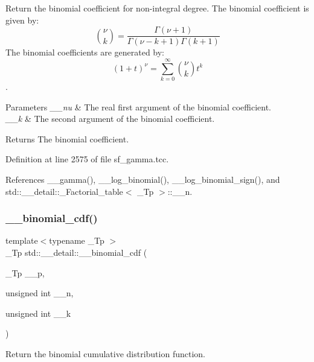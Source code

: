 Return the binomial coefficient for non-\/integral degree. The binomial coefficient is given by\+: \[ \binom{\nu}{k} = \frac{\Gamma(\nu+1)}{\Gamma(\nu-k+1) \Gamma(k+1)} \] The binomial coefficients are generated by\+: \[ \left(1 + t\right)^\nu = \sum_{k=0}^\infty \binom{\nu}{k} t^k \]. 


\begin{DoxyParams}{Parameters}
{\em \+\_\+\+\_\+nu} & The real first argument of the binomial coefficient. \\
\hline
{\em \+\_\+\+\_\+k} & The second argument of the binomial coefficient. \\
\hline
\end{DoxyParams}
\begin{DoxyReturn}{Returns}
The binomial coefficient. 
\end{DoxyReturn}


Definition at line 2575 of file sf\+\_\+gamma.\+tcc.



References \+\_\+\+\_\+gamma(), \+\_\+\+\_\+log\+\_\+binomial(), \+\_\+\+\_\+log\+\_\+binomial\+\_\+sign(), and std\+::\+\_\+\+\_\+detail\+::\+\_\+\+Factorial\+\_\+table$<$ \+\_\+\+Tp $>$\+::\+\_\+\+\_\+n.

\mbox{\label{namespacestd_1_1____detail_aefa3217863e0f50cd8f5379947cefcbd}} 
\subsubsection{\texorpdfstring{\+\_\+\+\_\+binomial\+\_\+cdf()}{\_\_binomial\_cdf()}}
{\footnotesize\ttfamily template$<$typename \+\_\+\+Tp $>$ \\
\+\_\+\+Tp std\+::\+\_\+\+\_\+detail\+::\+\_\+\+\_\+binomial\+\_\+cdf (\begin{DoxyParamCaption}\item[{\+\_\+\+Tp}]{\+\_\+\+\_\+p,  }\item[{unsigned int}]{\+\_\+\+\_\+n,  }\item[{unsigned int}]{\+\_\+\+\_\+k }\end{DoxyParamCaption})}



Return the binomial cumulative distribution function. 

